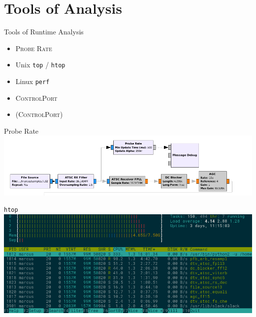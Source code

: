 \section{Tools of Analysis}
\begin{frame}{Tools of Runtime Analysis}

  \begin{itemize}
  \item<1-2> \GR \textsc{Probe Rate}
  \item<1-2> Unix \texttt{top} / \texttt{htop}
  \item<1-2> Linux \texttt{perf}
  \item<1> \GR \textsc{ControlPort}
  \item<2> (\GR \textsc{ControlPort})
  \end{itemize}

\end{frame}
\begin{frame}{Probe Rate}
  \includegraphics[width=\textwidth]{proberate}
\end{frame}
\begin{frame}{\texttt{htop}}
  \includegraphics[width=\textwidth]{htop}
\end{frame}
